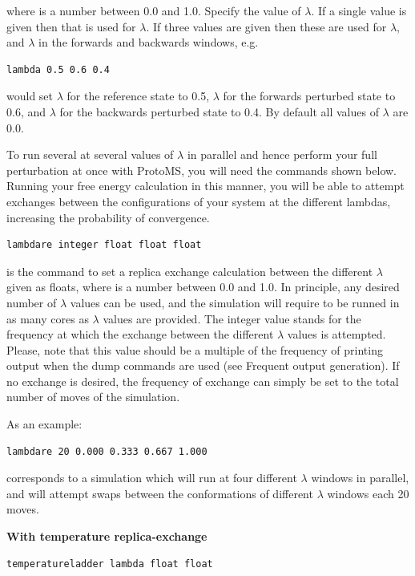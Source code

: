 \documentclass[letterpaper,10pt,english]{manual}
\begin{document}
where  is a number between 0.0 and 1.0. Specify the value of $\lambda$. If a single value is given then that is used for $\lambda$. If three values are given then these are used for $\lambda$, and $\lambda$ in the forwards and backwards windows, e.g.

\begin{Verbatim}[commandchars=@\[\]]
lambda 0.5 0.6 0.4
\end{Verbatim}

would set $\lambda$ for the reference state to 0.5, $\lambda$ for the forwards perturbed state to 0.6, and $\lambda$ for the backwards perturbed state to 0.4. By default all values of $\lambda$ are 0.0.

To run several at several values of $\lambda$  in parallel and hence perform your full perturbation at once with ProtoMS, you will need the commands shown below. Running your free energy calculation in this manner, you will be able to attempt exchanges between the configurations of your system at the different lambdas, increasing the probability of convergence.
\begin{Verbatim}[commandchars=@\[\]]
lambdare integer float float float
\end{Verbatim}

is the command to set a replica exchange calculation between the different $\lambda$ given as floats, where  is a number between 0.0 and 1.0. In principle, any desired number of $\lambda$ values can be used, and the simulation will require to be runned in as many cores as $\lambda$ values are provided. The integer value stands for the frequency at which the exchange between the different $\lambda$ values is attempted. Please, note that this value should be a multiple of the frequency of printing output when the dump commands are used (see Frequent output generation). If no exchange is desired, the frequency of exchange can simply be set to the total number of moves of the simulation.

As an example:

\begin{Verbatim}[commandchars=@\[\]]
lambdare 20 0.000 0.333 0.667 1.000
\end{Verbatim}

corresponds to a simulation which will run at four different $\lambda$ windows in parallel, and will attempt swaps between the conformations of different $\lambda$ windows each 20 moves.

\textbf{With temperature replica-exchange}
\begin{Verbatim}[commandchars=@\[\]]
temperatureladder lambda float float
\end{Verbatim}
\end{document}
